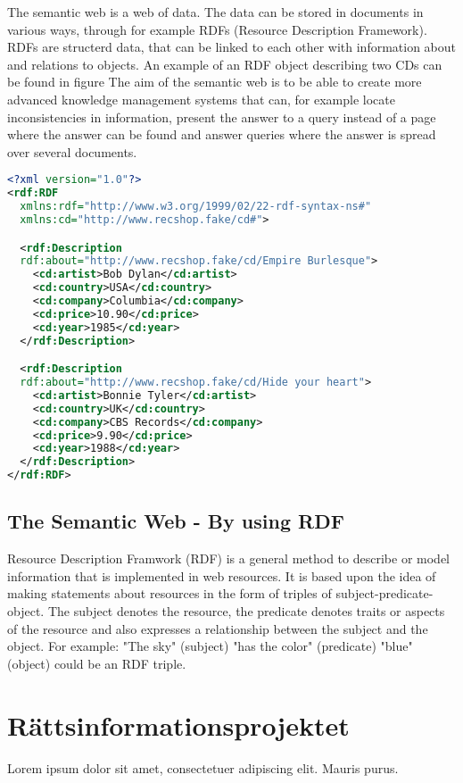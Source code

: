 \documentclass[a4paper,11pt]{kth-mag}
\begin{document}
The semantic web is a web of data. The data can be stored in documents in
various ways, through for example RDFs (Resource Description Framework). RDFs
are structerd data, that can be linked to each other with information about
and relations to objects. An example of an RDF object describing two CDs can
be found in figure The aim of the semantic web is to be able to create more
advanced knowledge management systems that can, for example locate
inconsistencies in information, present the answer to a query instead of a
page where the answer can be found and answer queries where the answer is
spread over several documents.

\begin{lstlisting}[language=xml, caption=An RDF example describing two records, label=rdfexample]
<?xml version="1.0"?>
<rdf:RDF 
  xmlns:rdf="http://www.w3.org/1999/02/22-rdf-syntax-ns#"
  xmlns:cd="http://www.recshop.fake/cd#">

  <rdf:Description
  rdf:about="http://www.recshop.fake/cd/Empire Burlesque">
    <cd:artist>Bob Dylan</cd:artist>
    <cd:country>USA</cd:country>
    <cd:company>Columbia</cd:company>
    <cd:price>10.90</cd:price>
    <cd:year>1985</cd:year>
  </rdf:Description>

  <rdf:Description
  rdf:about="http://www.recshop.fake/cd/Hide your heart">
    <cd:artist>Bonnie Tyler</cd:artist>
    <cd:country>UK</cd:country>
    <cd:company>CBS Records</cd:company>
    <cd:price>9.90</cd:price>
    <cd:year>1988</cd:year>
  </rdf:Description>
</rdf:RDF>
\end{lstlisting}

\subsection{The Semantic Web - By using RDF} Resource Description Framwork
(RDF) is a general method to describe or model information that is implemented
in web resources. It is based upon the idea of making statements about
resources in the form of triples of subject-predicate-object. The subject
denotes the resource, the predicate denotes traits or aspects of the resource
and also expresses a relationship between the subject and the object. For
example: "The sky" (subject) "has the color" (predicate) "blue" (object) could
be an RDF triple.

\section{Rättsinformationsprojektet}
Lorem ipsum dolor sit amet, consectetuer adipiscing elit. Mauris
purus. 
\end{document}

